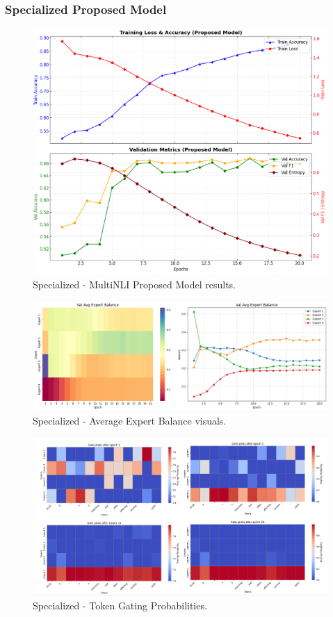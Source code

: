 \documentclass{article}
\begin{document}
\vspace{2cm}
\noindent
\subsubsection{Specialized Proposed Model}


\begin{figure}[H]
    \centering
    \includegraphics[width=0.74\linewidth]{s_graphs.png}
    \caption{Specialized - MultiNLI Proposed Model results.}
    \label{fig:o}
\end{figure}


\begin{figure}[H]
    \centering
    \includegraphics[width=1\linewidth]{s_visuals.png}
    \caption{Specialized - Average Expert Balance visuals.}
    \label{fig:i}
\end{figure}


\begin{figure}[H]
    \centering
    \includegraphics[width=0.7\linewidth]{s_tokens.png}
    \caption{Specialized - Token Gating Probabilities.}
    \label{fig:z}
\end{figure}
\end{document}
